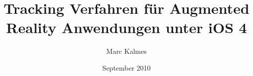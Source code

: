 %
%




\frontmatter

\ifpdf
{}
\else
{}
\fi

\titlehead{Fachhochschule Köln\\ Fakultät für Informatik und Ingenieurwissenschaften}
\subject{Diplomarbeit}
\title{Tracking Verfahren für Augmented Reality Anwendungen unter iOS 4}
\author{Marc Kalmes}
\date{September 2010}
\publishers{betreut durch Prof. Dr. Heiner Klocke}

\maketitle

\tableofcontents
\printglossary[style=altlist,title=Glossar]


\mainmatter


\nocite{*}

%
\printbibliography[]

\backmatter


